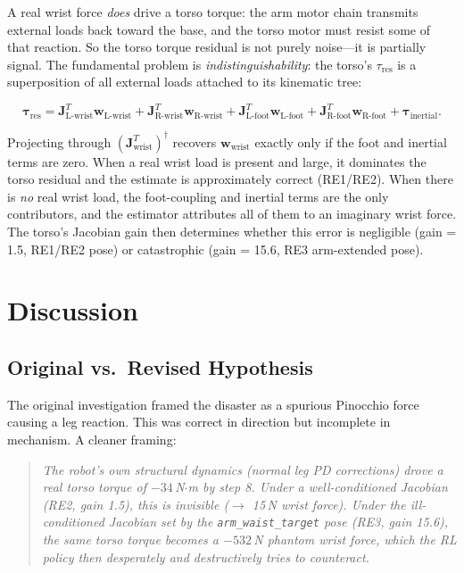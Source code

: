 \documentclass[11pt,a4paper]{article}
\newcommand{\pinv}[1]{#1^{\dagger}}
\newcommand{\bJ}{\bm{J}}
\newcommand{\btau}{\bm{\tau}}
\newcommand{\bw}{\bm{w}}
\begin{document}
A real wrist force \emph{does} drive a torso torque: the arm motor chain
transmits external loads back toward the base, and the torso motor must
resist some of that reaction.  So the torso torque residual is not
purely noise---it is partially signal.  The fundamental problem is
\emph{indistinguishability}: the torso's $\tau_\text{res}$ is a
superposition of all external loads attached to its kinematic tree:

\begin{equation}
  \btau_\text{res} = \bJ_{\text{L-wrist}}^T \bw_{\text{L-wrist}}
                   + \bJ_{\text{R-wrist}}^T \bw_{\text{R-wrist}}
                   + \bJ_{\text{L-foot}}^T \bw_{\text{L-foot}}
                   + \bJ_{\text{R-foot}}^T \bw_{\text{R-foot}}
                   + \btau_\text{inertial}.
  \label{eq:full_budget}
\end{equation}

Projecting through $\pinv{(\bJ_\text{wrist}^T)}$ recovers
$\bw_\text{wrist}$ exactly only if the foot and inertial terms are zero.
When a real wrist load is present and large, it dominates the torso
residual and the estimate is approximately correct (RE1/RE2).  When there
is \emph{no} real wrist load, the foot-coupling and inertial terms are
the only contributors, and the estimator attributes all of them to an
imaginary wrist force.  The torso's Jacobian gain then determines whether
this error is negligible (gain = 1.5, RE1/RE2 pose) or catastrophic
(gain = 15.6, RE3 arm-extended pose).

\section{Discussion}

\subsection{Original vs.\ Revised Hypothesis}

The original investigation framed the disaster as a spurious Pinocchio
force causing a leg reaction.  This was correct in direction but incomplete
in mechanism.  A cleaner framing:

\begin{quote}
\textit{The robot's own structural dynamics (normal leg PD corrections) drove
a real torso torque of $-34$\,N$\cdot$m by step 8.  Under a
well-conditioned Jacobian (RE2, gain 1.5), this is invisible ($\to$ 15\,N
wrist force).  Under the ill-conditioned Jacobian set by the
\texttt{arm\_waist\_target} pose (RE3, gain 15.6), the same torso torque
becomes a $-532$\,N phantom wrist force, which the RL policy then
desperately and destructively tries to counteract.}
\end{quote}
\end{document}
